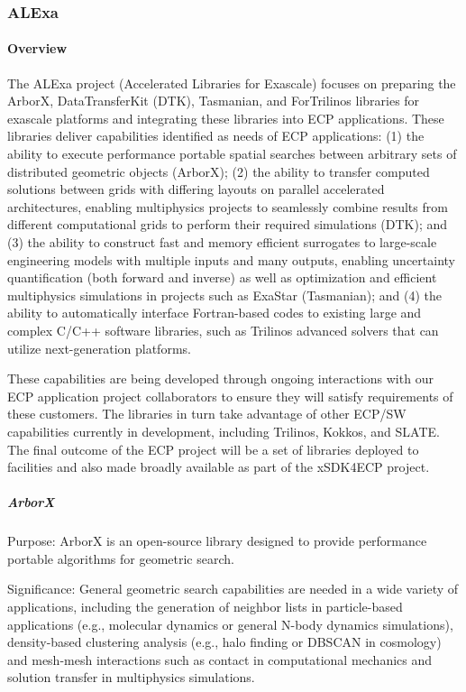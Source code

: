 \subsubsection{ ALExa}


\paragraph{Overview}

The ALExa project (Accelerated Libraries for Exascale) focuses on
preparing the ArborX, DataTransferKit (DTK), Tasmanian, and ForTrilinos libraries for exascale
platforms and integrating these libraries into ECP applications.
These libraries deliver capabilities identified as needs of ECP applications:
%
(1) the ability to execute performance portable spatial searches between
arbitrary sets of distributed geometric objects (ArborX);
%
(2) the ability to transfer computed
solutions between grids with differing layouts on parallel accelerated
architectures, enabling multiphysics projects to seamlessly combine results
from different computational grids to perform their required simulations
(DTK); and
%
(3) the ability to construct fast and memory efficient surrogates to
large-scale engineering models with multiple inputs and many outputs,
enabling uncertainty quantification (both forward and inverse) as well as
optimization and efficient multiphysics simulations in projects such as
ExaStar (Tasmanian); and
%
(4) the ability to automatically interface Fortran-based codes to existing
large and complex C/C++ software libraries, such as Trilinos advanced solvers
that can utilize next-generation platforms.


These capabilities are being developed through ongoing interactions with our
ECP application project collaborators to ensure they will satisfy requirements
of these customers.  The libraries in turn take advantage of other ECP/SW
capabilities currently in development, including Trilinos,
Kokkos, and SLATE.  The final outcome of the ECP project will be a set of
libraries deployed to facilities and also made broadly available as part of
the xSDK4ECP project.


\subparagraph{ArborX}
Purpose: ArborX is an open-source library designed to provide
performance portable algorithms for geometric search.

Significance: General geometric search capabilities are needed in a wide
variety of applications, including the generation of neighbor lists in
particle-based applications (e.g., molecular dynamics or general N-body
dynamics simulations), density-based clustering analysis (e.g., halo finding
or DBSCAN in cosmology) and mesh-mesh interactions such as contact in
computational mechanics and solution transfer in multiphysics simulations.

